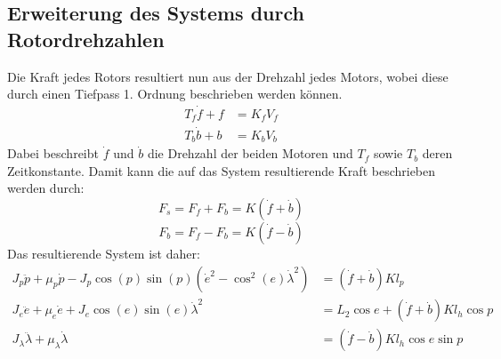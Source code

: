 \documentclass{article}
\begin{document}
\subsection{Erweiterung des Systems durch Rotordrehzahlen}
Die Kraft jedes Rotors resultiert nun aus der Drehzahl jedes Motors, wobei diese durch einen Tiefpass 1. Ordnung beschrieben werden können.
\begin{align}
T_f \dot{f} + f &= K_f V_f\\
T_b \dot{b} + b &= K_b V_b
\end{align}
Dabei beschreibt $\dot{f}$ und $\dot{b}$ die Drehzahl der beiden Motoren und $T_f$ sowie $T_b$ deren Zeitkonstante.
Damit kann die auf das System resultierende Kraft beschrieben werden durch:
\begin{equation}
F_s = F_f + F_b = K (\dot{f} + \dot{b})
\end{equation}
\begin{equation}
F_b = F_f - F_b = K (\dot{f} - \dot{b})
\end{equation}
Das resultierende System ist daher:
\begin{align}
J_p \ddot{p} + \mu_p \dot{p} - J_p \cos (p) \sin (p) (\dot{e}^2- \cos^2 (e) \dot{\lambda}^2) &= (\dot{f} + \dot{b}) K l_p\\
J_e\ddot{e} + \mu_e \dot{e} + J_e \cos (e) \sin (e) \dot{\lambda}^2 
&= L_2 \cos e + (\dot{f} + \dot{b}) K l_h \cos p\\
J_\lambda \ddot{\lambda} + \mu_\lambda \dot{\lambda} &= (\dot{f} - \dot{b}) K l_h \cos e \sin p
\end{align}
\end{document}
